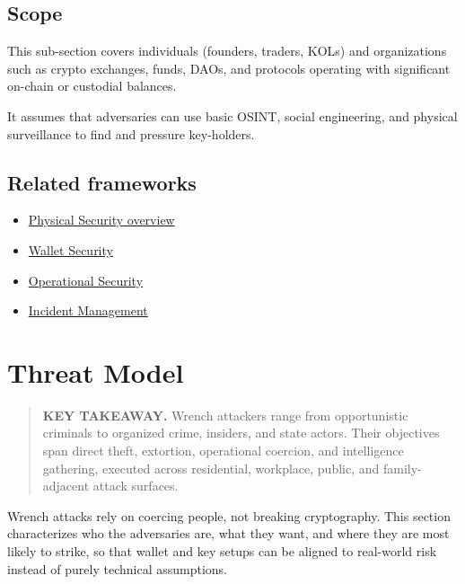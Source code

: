 \section{Scope}\label{scope}

This sub-section covers individuals (founders, traders, KOLs) and organizations such as crypto exchanges, funds, DAOs, and protocols operating with significant on-chain or custodial balances.

It assumes that adversaries can use basic OSINT, social engineering, and physical surveillance to find and pressure key-holders.

\section{Related frameworks}\label{related-frameworks-1}

\begin{itemize}
\tightlist
\item
  \href{https://frameworks.securityalliance.dev/physical-security/overview}{Physical Security overview}
\item
  \href{https://frameworks.securityalliance.dev/wallet-security/overview}{Wallet Security}
\item
  \href{https://frameworks.securityalliance.dev/opsec/overview}{Operational Security}
\item
  \href{https://frameworks.securityalliance.dev/incident-management/overview}{Incident Management}
\end{itemize}

\chapter{Threat Model}\label{threat-model}

\begin{quote}
\textbf{KEY TAKEAWAY.} Wrench attackers range from opportunistic criminals to organized crime, insiders, and state actors. Their objectives span direct theft, extortion, operational coercion, and intelligence gathering, executed across residential, workplace, public, and family-adjacent attack surfaces.
\end{quote}

Wrench attacks rely on coercing people, not breaking cryptography. This section characterizes who the adversaries are, what they want, and where they are most likely to strike, so that wallet and key setups can be aligned to real-world risk instead of purely technical assumptions.

